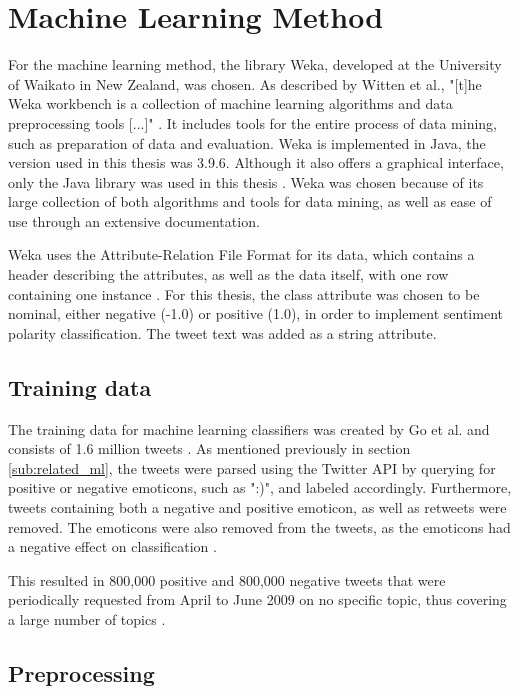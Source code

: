 \section{Machine Learning Method}

For the machine learning method, the library Weka, developed at the University of Waikato in New Zealand, was chosen. As described by Witten et al., "[t]he Weka workbench is a collection of machine learning algorithms and data preprocessing tools [...]" \cite[p.~7]{Weka}. It includes tools for the entire process of data mining, such as preparation of data and evaluation. Weka is implemented in Java, the version used in this thesis was 3.9.6. Although it also offers a graphical interface, only the Java library was used in this thesis \cite{Weka}. Weka was chosen because of its large collection of both algorithms and tools for data mining, as well as ease of use through an extensive documentation.

Weka uses the Attribute-Relation File Format for its data, which contains a header describing the attributes, as well as the data itself, with one row containing one instance \cite{Weka}. For this thesis, the class attribute was chosen to be nominal, either negative (-1.0) or positive (1.0), in order to implement sentiment polarity classification. The tweet text was added as a string attribute.

\subsection{Training data}
The training data for machine learning classifiers was created by Go et al. and consists of 1.6 million tweets \cite{GoBHaHua2009}. As mentioned previously in section \ref{sub:related_ml}, the tweets were parsed using the Twitter API by querying for positive or negative emoticons, such as ":)", and labeled accordingly. Furthermore, tweets containing both a negative and positive emoticon, as well as retweets were removed. The emoticons were also removed from the tweets, as the emoticons had a negative effect on classification \cite{GoBHaHua2009}.

This resulted in 800,000 positive and 800,000 negative tweets that were periodically requested from April to June 2009 on no specific topic, thus covering a large number of topics \cite{GoBHaHua2009}.

\subsection{Preprocessing}

